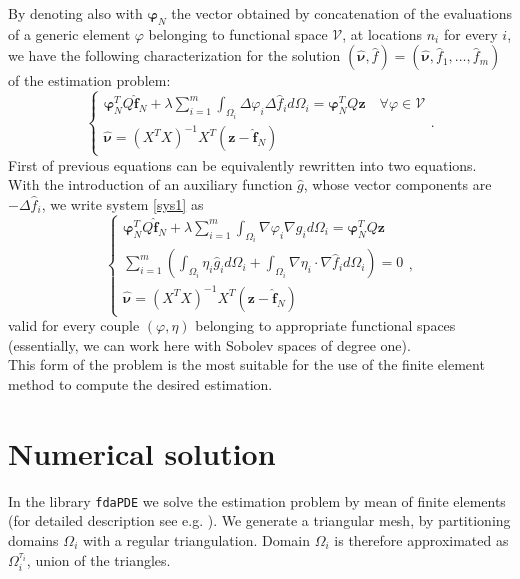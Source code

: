 By denoting also with $\bm{\varphi}_N$ the vector obtained by concatenation of
the evaluations of a generic element $\varphi$ belonging to functional space
$\mathcal{V}$, at locations $n_i$ for every $i$, we have the following
characterization for the solution $\left(\hat{\bm{\nu}} , \hat{f} \right) =
	\left(\hat{\bm{\nu}} , \hat{f}_1, \dots, \hat{f}_m \right)$ of the estimation
problem:
\begin{equation}
	\begin{cases}
		\bm{\varphi}_N^T Q \hat{\bm{f}}_N + \lambda \sum_{i = 1}^m \int_{\Omega_i}\Delta \varphi_i \Delta \hat{f}_i  d\Omega_i = \bm{\varphi}_N^T Q \bm{z} \quad \forall \varphi \in \mathcal{V} \\
		\hat{\bm{\nu}}=\left(X^TX\right)^{-1}X^T(\bm{z}-\hat{\bm{f}}_N)
	\end{cases}
	. \label{sys1}
\end{equation}
First of previous equations can be equivalently rewritten into two
equations. With the introduction of an auxiliary function $\hat{g}$, whose
vector components are $-\Delta \hat{f}_i$, we write system \ref{sys1} as
\begin{equation}
	\label{triple}
	\begin{cases}
		\bm{\varphi}_N^T Q \hat{\bm{f}}_N + \lambda \sum_{i = 1}^m \int_{\Omega_i}\nabla \varphi_i \nabla g_i d\Omega_i = \bm{\varphi}_N^T Q \bm{z} \\
		\sum_{i=1}^{m}\left(\int_{\Omega_i}\eta_i \hat{g}_i d\Omega_i +\int_{\Omega_i}\nabla \eta_i \cdot \nabla \hat{f}_i d\Omega_i\right)=0       \\
		\hat{\bm{\nu}}=\left(X^TX\right)^{-1}X^T(\bm{z}-\hat{\bm{f}}_N)
	\end{cases}
	,
\end{equation}
valid for every couple $(\varphi,\eta)$ belonging to appropriate
functional spaces (essentially, we can work here with Sobolev spaces of degree
one).\\ This form of the problem is the most suitable for the use of the finite
element method to compute the desired estimation.

\section{Numerical solution}
In the library \texttt{fdaPDE} we solve the estimation problem by mean of
finite elements (for detailed description see e.g. \cite{quarteronitosto}). We
generate a triangular mesh, by partitioning domains $\Omega_i$ with a regular
triangulation. Domain $\Omega_i$ is therefore approximated as
$\Omega_i^{\tau_i}$, union of the triangles.

